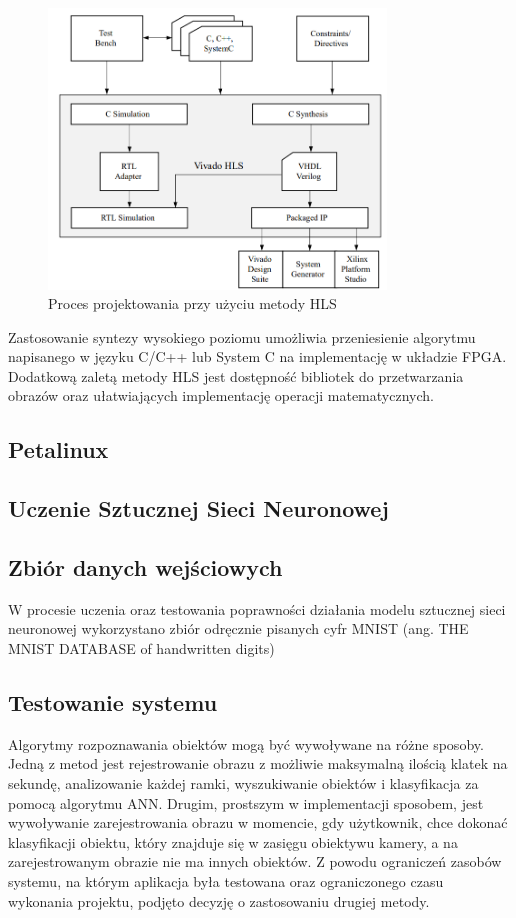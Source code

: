 \begin{figure}
  \centering
  \includegraphics[width=0.8\textwidth]{img/hls_design_flow.png}
  \caption{Proces projektowania przy użyciu metody HLS}
  \label{hls_design_flow}
\end{figure}

Zastosowanie syntezy wysokiego poziomu umożliwia przeniesienie algorytmu napisanego w języku C/C++ lub System C na implementację w układzie FPGA. Dodatkową zaletą metody HLS jest dostępność bibliotek do przetwarzania obrazów oraz ułatwiających implementację operacji matematycznych. 

\subsection{Petalinux}

\subsection{Uczenie Sztucznej Sieci Neuronowej}

\subsection{Zbiór danych wejściowych}

W procesie uczenia oraz testowania poprawności działania modelu sztucznej 
sieci neuronowej wykorzystano zbiór odręcznie pisanych cyfr MNIST 
(ang. THE MNIST DATABASE of handwritten digits)
\cite{lecun-mnisthandwrittendigit-2010}


\subsection{Testowanie systemu}

Algorytmy rozpoznawania obiektów mogą być wywoływane na różne sposoby. 
Jedną z metod jest rejestrowanie obrazu z możliwie maksymalną ilością klatek 
na sekundę, analizowanie każdej ramki, wyszukiwanie obiektów i klasyfikacja za 
pomocą algorytmu ANN. Drugim, prostszym w implementacji sposobem, jest wywoływanie 
zarejestrowania obrazu w momencie, gdy użytkownik, chce dokonać klasyfikacji 
obiektu, który znajduje się w zasięgu obiektywu kamery, a na zarejestrowanym 
obrazie nie ma innych obiektów. Z powodu ograniczeń zasobów systemu, na którym 
aplikacja była testowana oraz ograniczonego czasu wykonania projektu, podjęto 
decyzję o zastosowaniu drugiej metody. 


